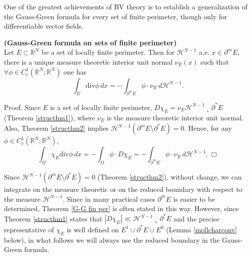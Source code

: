 One of the greatest achievements of BV theory is to establish a generalization of the Gauss-Green formula for every set of finite perimeter, though only for differentiable vector fields. 

\begin{theorem} \label{G-G fin per} {\bf (Gauss-Green formula on sets of finite perimeter)}
\\
Let $E \subset \mathbb{R}^{N}$ be a set of locally finite perimeter. Then for $\mathcal{H}^{N-1}$ a.e. $x \in \partial^{m} E$, there is a unique measure theoretic interior unit normal $\nu_{E}(x)$ such that $\forall \phi \in C_{c}^{1}(\mathbb{R}^{N}; \mathbb{R}^{N})$ one has
\[ \int_{E} \mathrm{div}\phi\, dx = - \int_{\partial^{m} E} \phi \cdot \nu_{E}\, d\mathcal{H}^{N-1}. \]
\end{theorem}
Proof. Since $E$ is a set of locally finite perimeter, $D \chi_{E} = \nu_{E} \mathcal{H}^{N - 1} \llcorner \partial^{*} E$ (Theorem \ref{structhm1}), where $\nu_{E}$ is the measure theoretic interior unit normal. Also, Theorem \ref{structhm2} implies $\mathcal{H}^{N - 1}(\partial^{m} E \setminus \partial^{*} E) = 0$. Hence, for any $\phi \in C^{1}_{c}(\mathbb{R}^{N}; \mathbb{R}^{N})$,
\[ \int_{\Omega} \chi_{E} \mathrm{div}\phi\, dx = - \int_{\Omega} \phi \cdot D \chi_{E} = - \int_{\partial^{m} E} \phi \cdot \nu_{E}\, d\mathcal{H}^{N-1}. \ \Box \]

\begin{remark} Since $\mathcal{H}^{N - 1} (\partial^{m} E \setminus \partial^{*} E) = 0$ (Theorem \ref{structhm2}), without change, we can integrate on the measure theoretic or on the reduced boundary with respect to the measure $\mathcal{H}^{N - 1}$. Since in many practical cases $\partial^{m} E$ is easier to be determined, Theorem \ref{G-G fin per} is often stated in this way. However, since Theorem \ref{structhm1} states that $|D \chi_{E}| \ll \mathcal{H}^{N - 1} \llcorner \partial^{*} E$ and the precise representative of $\chi_{E}$ is well defined on $E^{1} \cup \partial^{*}E \cup E^{0}$ (Lemma \ref{mollcharconv} below), in what follows we will always use the reduced boundary in the Gauss-Green formula.
\end{remark}

